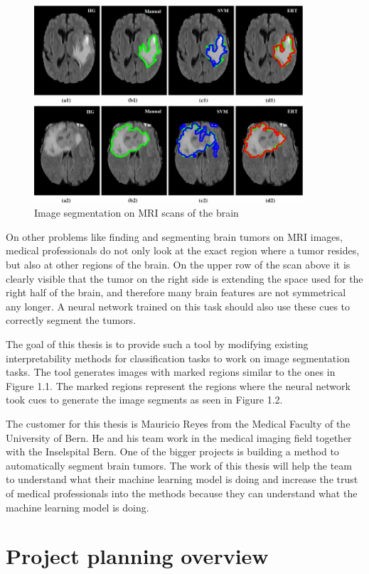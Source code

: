 \begin{figure}[H]
\centering
\caption{Image segmentation on MRI scans of the brain \cite{soltaninejad2017automated}}
\includegraphics[width=10cm]{images/brain_segmentation.jpg}
\end{figure}

On other problems like finding and segmenting brain tumors on MRI images, medical professionals do not only look at the exact region where a tumor resides, but also at other regions of the brain. On the upper row of the scan above it is clearly visible that the tumor on the right side is extending the space used for the right half of the brain, and therefore many brain features are not symmetrical any longer. A neural network trained on this task should also use these cues to correctly segment the tumors. 

The goal of this thesis is to provide such a tool by modifying existing interpretability methods for classification tasks to work on image segmentation tasks. The tool generates images with marked regions similar to the ones in Figure 1.1. The marked regions represent the regions where the neural network took cues to generate the image segments as seen in Figure 1.2.

The customer for this thesis is Mauricio Reyes from the Medical Faculty of the University of Bern. He and his team work in the medical imaging field together with the Inselspital Bern. One of the bigger projects is building a method to automatically segment brain tumors. The work of this thesis will help the team to understand what their machine learning model is doing and increase the trust of medical professionals into the methods because they can understand what the machine learning model is doing.

\section{Project planning overview}

